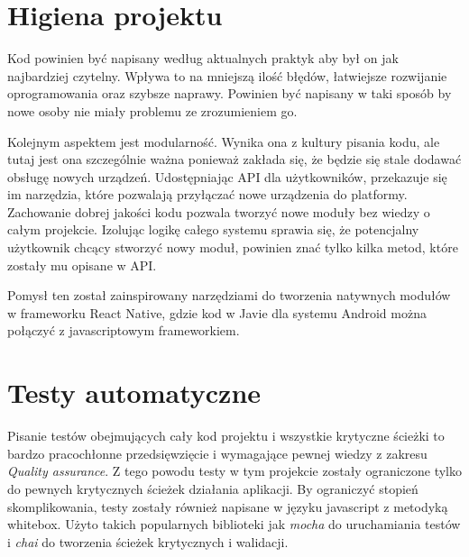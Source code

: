 \section{Higiena projektu}
Kod powinien być napisany według aktualnych praktyk aby był on jak najbardziej czytelny. Wpływa to na mniejszą ilość błędów, łatwiejsze rozwijanie  oprogramowania oraz szybsze naprawy. Powinien być napisany w taki sposób by nowe osoby nie miały problemu ze zrozumieniem go. \par
Kolejnym aspektem jest modularność. Wynika ona z kultury pisania kodu, ale tutaj jest ona szczególnie ważna ponieważ zakłada się, że będzie się stale dodawać obsługę nowych urządzeń. Udostępniając API dla użytkowników, przekazuje się im narzędzia, które pozwalają przyłączać nowe urządzenia do platformy. Zachowanie dobrej jakości kodu pozwala tworzyć nowe moduły bez wiedzy o całym projekcie. Izolując logikę całego systemu sprawia się, że potencjalny użytkownik chcący stworzyć nowy moduł, powinien znać tylko kilka metod, które zostały mu opisane w API. \cite{cleancode}
\par Pomysł ten został zainspirowany narzędziami do tworzenia natywnych modułów w frameworku React Native, gdzie kod w Javie dla systemu Android można połączyć z javascriptowym frameworkiem. \cite{ReactNativeModules}
\section{Testy automatyczne}
Pisanie testów obejmujących cały kod projektu i wszystkie krytyczne ścieżki to bardzo pracochłonne przedsięwzięcie i wymagające pewnej wiedzy z zakresu \textit{Quality assurance}. Z tego powodu testy w tym projekcie zostały ograniczone tylko do pewnych krytycznych ścieżek działania aplikacji. By ograniczyć stopień skomplikowania, testy zostały również napisane w języku javascript z metodyką whitebox. Użyto takich popularnych biblioteki jak \textit{mocha} do uruchamiania testów i \textit{chai} do tworzenia ścieżek krytycznych i walidacji. \cite{chai, mocha}